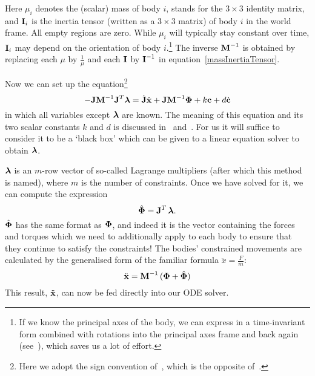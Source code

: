 Here $\mu_i$ denotes the (scalar) mass of body $i$,  stands for the $3\times3$
identity matrix, and $\m{I}_i$ is the inertia tensor (written as a $3\times3$ matrix)
of body $i$ in the world frame. All empty regions are zero. While $\mu_i$ will typically
stay constant over time, $\m{I}_i$ may depend on the orientation of body $i$.\footnote{If
we know the principal axes of the body, we can express  in a time-invariant
form combined with rotations into the principal axes frame and back again
(see~\cite{BaraffWitkin:97}), which saves us a lot of effort.} The inverse $\m{M}^{-1}$
is obtained by replacing each $\mu$ by $\frac{1}{\mu}$ and each $\m{I}$ by
$\m{I}^{-1}$ in equation~\ref{massInertiaTensor}.

Now we can set up the equation\footnote{Here we adopt the sign convention
of~\cite{BaraffWitkin:97}, which is the opposite of~\cite{Saunders:PhD}.}
\begin{equation}
\label{lagrangeEquation}
-\m{J}\m{M}^{-1}\m{J}^T\ve{\lambda} = \dot{\m{J}}\dot{\ve{x}} +
    \m{J}\m{M}^{-1}\ve{\Phi} + k\ve{c} + d\dot{\ve{c}}
\end{equation}
in which all variables except $\ve{\lambda}$ are known. The meaning of this equation and
its two scalar constants $k$ and $d$ is discussed in~\cite{BaraffWitkin:97}
and~\cite{Saunders:PhD}. For us it will suffice to consider it to be a `black box' which can be
given to a linear equation solver to obtain $\ve{\lambda}$.

$\ve{\lambda}$ is an $m$-row vector of so-called Lagrange multipliers (after which this method
is named), where $m$ is the number of constraints. Once we have solved for it, we can compute
the expression
\begin{equation}
\hat{\ve{\Phi}} = \m{J}^T\,\ve{\lambda}.
\end{equation}
$\hat{\ve{\Phi}}$ has the same format as $\ve{\Phi}$, and indeed it is the vector containing
the forces and torques which we need to additionally apply to each body to ensure that they
continue to satisfy the constraints! The bodies' constrained movements are calculated by
the generalised form of the familiar formula $\ddot{x} = \frac{F}{m}$:
\begin{equation}
\ddot{\ve{x}} = \m{M}^{-1}\,(\ve{\Phi} + \hat{\ve{\Phi}})
\end{equation}
This result, $\ddot{\ve{x}}$, can now be fed directly into our ODE solver.
